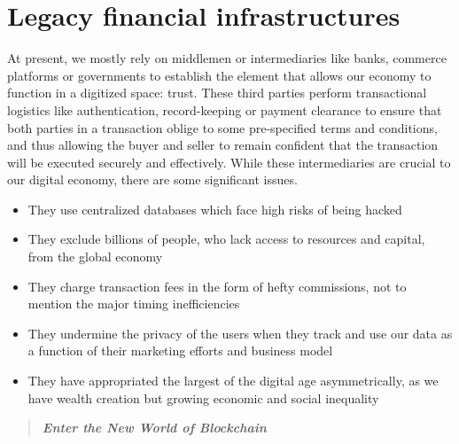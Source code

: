 \section{Legacy financial infrastructures}

At present, we mostly rely on middlemen or intermediaries like banks, commerce platforms or governments to establish the element that allows our economy to function in a digitized space: trust. These third parties perform transactional logistics like authentication, record-keeping or payment clearance to ensure that both parties in a transaction oblige to some pre-specified terms and conditions, and thus allowing the buyer and seller to remain confident that the transaction will be executed securely and effectively.
While these intermediaries are crucial to our digital economy, there are some significant issues.

\begin{itemize}
    \setlength\itemsep{0em}

    \item They use centralized databases which face high risks of being hacked
    \item They exclude billions of people, who lack access to resources and capital, from the global economy
    \item They charge transaction fees in the form of hefty commissions, not to mention the major timing inefficiencies
    \item They undermine the privacy of the users when they track and use our data as a function of their marketing efforts and business model
    \item They have appropriated the largest of the digital age asymmetrically, as we have wealth creation but growing economic and social inequality
\end{itemize}

\begin{quote}
    \textbf{\emph{Enter the New World of Blockchain}}
\end{quote}
